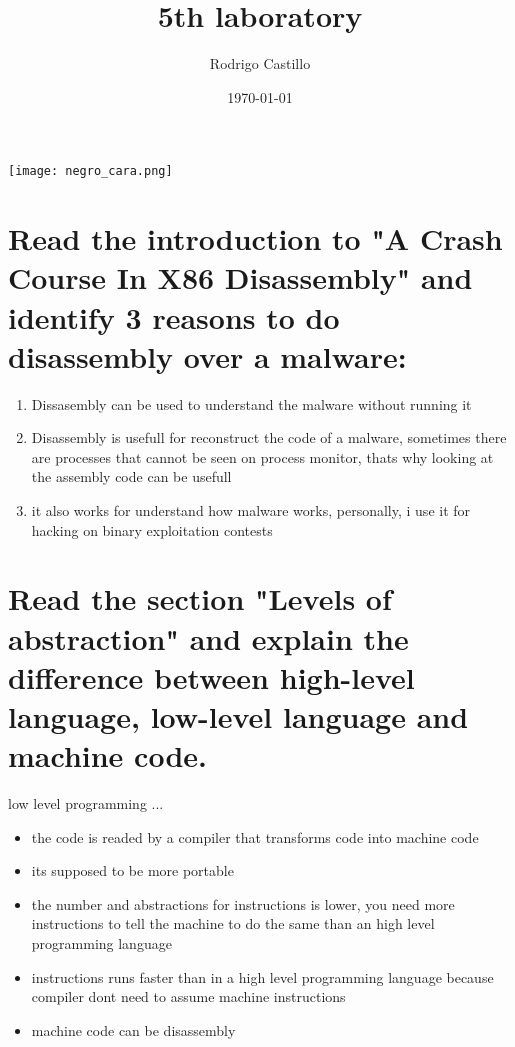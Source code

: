 \documentclass[10pt,a4paper]{article} %
\begin{document}
    \title{{  5th laboratory  }}
    \author{{Rodrigo Castillo}}
    \date{\today}

    \maketitle


    \texttt{[image: negro\_cara.png]}

    \section{Read the introduction to "A Crash Course In X86 Disassembly" and
    identify 3 reasons to do disassembly over a malware:}

        \begin{enumerate}
            \item {Dissasembly can be used to understand the malware without
                running it}
            \item {Disassembly is usefull for reconstruct the code of a
                malware, sometimes there are processes that cannot be seen on
                process monitor, thats why looking at the assembly code can be
                usefull}
            \item {it also works for understand how malware works, personally,
                i use it for hacking on binary exploitation contests}
        \end{enumerate}

    \section{Read the section "Levels of abstraction" and explain the
        difference between high-level language, low-level language and machine
        code.}

        \color{red} low level programming ... \color{white}
        \begin{itemize}
            \item {the code is readed by a compiler that transforms code into
                machine code}
            \item {its supposed to be more portable}
            \item {the number and abstractions for instructions is lower, you
                need more instructions to tell the machine to do the same than
                an high level programming language}
            \item {instructions runs faster than in a high level programming
                language because compiler dont need to assume machine
                instructions}
            \item {machine code can be disassembly}
        \end{itemize}
\end{document}
